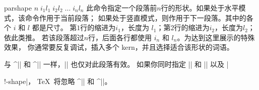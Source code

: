 
%
\begindesc
\cts parshape {$n\; i_1 l_1\; i_2 l_2\; \ldots \;i_n l_n$}
\explain
此命令指定一个段落前$n$行的形状。如果处于水平模式，该命令作用于当前段落；
如果处于竖直模式，则作用于下一段落。其中的各个 $i$ 和 $l$ 都是尺寸。
第$1$行的缩进为$i_1$，长度为 $l_1$；第$2$行的缩进为$i_2$，长度为$l_2$；依此类推。
若该段落超过$n$行，后面各行都使用 $i_n$ 和 $l_n$。为达到这里展示的特殊效果，
你通常要反复调试，插入多个 kern，并且选择适合该形状的词语。

与 ^|\hangafter| 和 ^|\hangindent| 一样，|\parshape| 也仅对此段落有效。
如果你同时指定 |\hangafter| 和 |\hangindent| 以及 |\par!-shape|，
\TeX\ 将忽略 ^|\hangafter| 和 ^|\hangindent|。
\ifodd\pageno\vfill\eject\fi %


